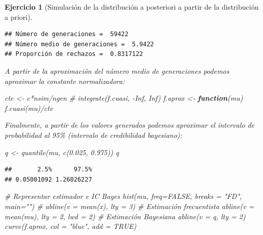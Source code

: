 \documentclass[
]{book}
\newenvironment{Shaded}{\begin{snugshade}}{\end{snugshade}}
\newcommand{\AttributeTok}[1]{\textcolor[rgb]{0.77,0.63,0.00}{#1}}
\newcommand{\CommentTok}[1]{\textcolor[rgb]{0.56,0.35,0.01}{\textit{#1}}}
\newcommand{\ConstantTok}[1]{\textcolor[rgb]{0.00,0.00,0.00}{#1}}
\newcommand{\ControlFlowTok}[1]{\textcolor[rgb]{0.13,0.29,0.53}{\textbf{#1}}}
\newcommand{\DecValTok}[1]{\textcolor[rgb]{0.00,0.00,0.81}{#1}}
\newcommand{\FloatTok}[1]{\textcolor[rgb]{0.00,0.00,0.81}{#1}}
\newcommand{\FunctionTok}[1]{\textcolor[rgb]{0.00,0.00,0.00}{#1}}
\newcommand{\NormalTok}[1]{#1}
\newcommand{\OtherTok}[1]{\textcolor[rgb]{0.56,0.35,0.01}{#1}}
\newcommand{\SpecialCharTok}[1]{\textcolor[rgb]{0.00,0.00,0.00}{#1}}
\newcommand{\StringTok}[1]{\textcolor[rgb]{0.31,0.60,0.02}{#1}}
\theoremstyle{break}
\newtheorem{exercise}{Ejercicio}[chapter]
\theoremstyle{nonumberplain}
\begin{document}
\begin{exercise}[Simulación de la distribución a posteriori a partir de la distribución a priori]
\begin{enumerate}
\begin{verbatim}
## Número de generaciones =  59422
## Número medio de generaciones =  5.9422
## Proporción de rechazos =  0.8317122
\end{verbatim}

  A partir de la aproximación del número medio de generaciones podemos aproximar la constante normalizadora:

\begin{Shaded}
\begin{Highlighting}[]
\NormalTok{cte }\OtherTok{\textless{}{-}}\NormalTok{ c}\SpecialCharTok{*}\NormalTok{nsim}\SpecialCharTok{/}\NormalTok{ngen}
\CommentTok{\# integrate(f.cuasi, {-}Inf, Inf)}
\NormalTok{f.aprox }\OtherTok{\textless{}{-}} \ControlFlowTok{function}\NormalTok{(mu) }\FunctionTok{f.cuasi}\NormalTok{(mu)}\SpecialCharTok{/}\NormalTok{cte}
\end{Highlighting}
\end{Shaded}

  Finalmente, a partir de los valores generados podemos aproximar el intervalo de probabilidad al 95\% (intervalo de credibilidad bayesiano):

\begin{Shaded}
\begin{Highlighting}[]
\NormalTok{q }\OtherTok{\textless{}{-}} \FunctionTok{quantile}\NormalTok{(mu, }\FunctionTok{c}\NormalTok{(}\FloatTok{0.025}\NormalTok{, }\FloatTok{0.975}\NormalTok{))}
\NormalTok{q}
\end{Highlighting}
\end{Shaded}

\begin{verbatim}
##       2.5%      97.5% 
## 0.05001092 1.26026227
\end{verbatim}

\begin{Shaded}
\begin{Highlighting}[]
\CommentTok{\# Representar estimador e IC Bayes}
\FunctionTok{hist}\NormalTok{(mu, }\AttributeTok{freq=}\ConstantTok{FALSE}\NormalTok{, }\AttributeTok{breaks =} \StringTok{"FD"}\NormalTok{, }\AttributeTok{main=}\StringTok{""}\NormalTok{)}
\CommentTok{\# abline(v = mean(x), lty = 3) \# Estimación frecuentista}
\FunctionTok{abline}\NormalTok{(}\AttributeTok{v =} \FunctionTok{mean}\NormalTok{(mu), }\AttributeTok{lty =} \DecValTok{2}\NormalTok{, }\AttributeTok{lwd =} \DecValTok{2}\NormalTok{)  }\CommentTok{\# Estimación Bayesiana}
\FunctionTok{abline}\NormalTok{(}\AttributeTok{v =}\NormalTok{ q, }\AttributeTok{lty =} \DecValTok{2}\NormalTok{)}
\FunctionTok{curve}\NormalTok{(f.aprox, }\AttributeTok{col =} \StringTok{"blue"}\NormalTok{, }\AttributeTok{add =} \ConstantTok{TRUE}\NormalTok{)}
\end{Highlighting}
\end{Shaded}


\end{enumerate}
\end{exercise}
\end{document}
